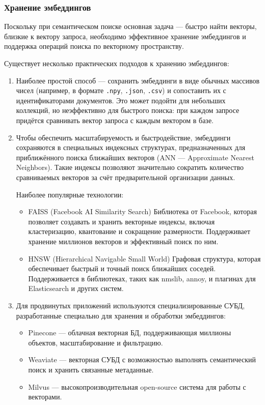 \documentclass[coursework]{SCWorks}
\begin{document}
\subsubsection{Хранение эмбеддингов}
Поскольку при семантическом поиске основная задача — быстро найти векторы, близкие к вектору запроса, необходимо эффективное хранение эмбеддингов и поддержка операций поиска по векторному пространству.

Существует несколько практических подходов к хранению эмбеддингов:
\begin{enumerate}
    \item
Наиболее простой способ — сохранить эмбеддинги в виде обычных массивов чисел (например, в формате \verb|.npy|, \verb|.json|, \verb|.csv|) и сопоставить их с идентификаторами документов. Это может подойти для небольших коллекций, но неэффективно для быстрого поиска: при каждом запросе придётся сравнивать вектор запроса с каждым вектором в базе.

    \item Чтобы обеспечить масштабируемость и быстродействие, эмбеддинги сохраняются в специальных индексных структурах, предназначенных для приближённого поиска ближайших векторов (ANN — Approximate Nearest Neighbors). Такие индексы позволяют значительно сократить количество сравниваемых векторов за счёт предварительной организации данных.

Наиболее популярные технологии:
\begin{itemize}
    \item 
    FAISS (Facebook AI Similarity Search)
    Библиотека от Facebook, которая позволяет создавать и хранить векторные индексы, включая кластеризацию, квантование и сокращение размерности. Поддерживает хранение миллионов векторов и эффективный поиск по ним.

    \item HNSW (Hierarchical Navigable Small World)
    Графовая структура, которая обеспечивает быстрый и точный поиск ближайших соседей. Поддерживается в библиотеках, таких как nmslib, annoy, и плагинах для Elasticsearch и других систем.
\end{itemize}

    \item Для продвинутых приложений используются специализированные СУБД, разработанные специально для хранения и обработки эмбеддингов:
    \begin{itemize}
        \item 
        Pinecone — облачная векторная БД, поддерживающая миллионы объектов, масштабирование и фильтрацию.

        \item Weaviate — векторная СУБД с возможностью выполнять семантический поиск и хранить связанные метаданные.

        \item Milvus — высокопроизводительная open-source система для работы с векторами.
        \end{itemize}
\end{enumerate}
\end{document}
